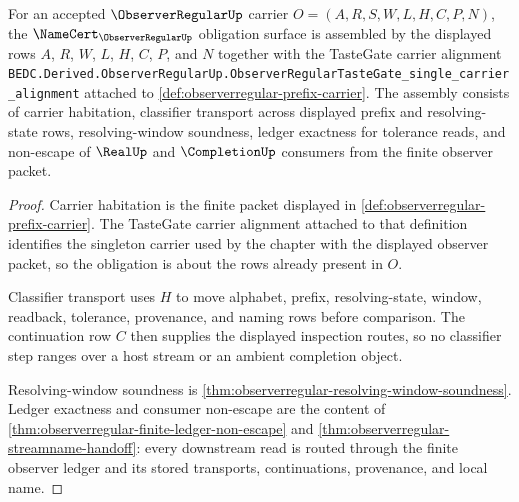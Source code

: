 \begin{theorem}
\label{thm:observerregular-tastegate-obligation-assembly}
For an accepted $\ObserverRegularUp$ carrier $O=(A,R,S,W,L,H,C,P,N)$, the $\NameCert_{\ObserverRegularUp}$ obligation surface is assembled by the displayed rows $A$, $R$, $W$, $L$, $H$, $C$, $P$, and $N$ together with the TasteGate carrier alignment
\texttt{BEDC.Derived.ObserverRegularUp.ObserverRegularTasteGate\_single\_carrier\_alignment}
attached to \autoref{def:observerregular-prefix-carrier}. The assembly consists of carrier habitation, classifier transport across displayed prefix and resolving-state rows, resolving-window soundness, ledger exactness for tolerance reads, and non-escape of $\RealUp$ and $\CompletionUp$ consumers from the finite observer packet.
\end{theorem}
\begin{proof}
Carrier habitation is the finite packet displayed in \autoref{def:observerregular-prefix-carrier}. The TasteGate carrier alignment attached to that definition identifies the singleton carrier used by the chapter with the displayed observer packet, so the obligation is about the rows already present in $O$.

Classifier transport uses $H$ to move alphabet, prefix, resolving-state, window, readback, tolerance, provenance, and naming rows before comparison. The continuation row $C$ then supplies the displayed inspection routes, so no classifier step ranges over a host stream or an ambient completion object.

Resolving-window soundness is \autoref{thm:observerregular-resolving-window-soundness}. Ledger exactness and consumer non-escape are the content of \autoref{thm:observerregular-finite-ledger-non-escape} and \autoref{thm:observerregular-streamname-handoff}: every downstream read is routed through the finite observer ledger and its stored transports, continuations, provenance, and local name.
\end{proof}

